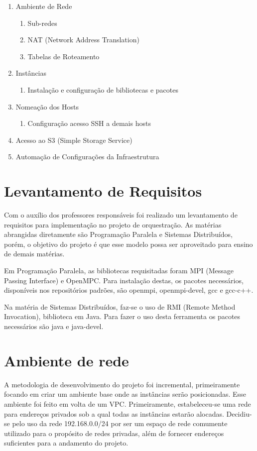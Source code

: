 \documentclass[tg]{mdtufsm}
\begin{document}
\begin{enumerate}
	\item Ambiente de Rede
	\begin{enumerate}
		\item Sub-redes
		\item NAT (Network Address Translation)
		\item Tabelas de Roteamento
	\end{enumerate}
	\item Instâncias
	\begin{enumerate}
		\item Instalação e configuração de bibliotecas e pacotes
	\end{enumerate}
	\item Nomeação dos Hosts
	\begin{enumerate}
		\item Configuração acesso SSH a demais hosts
	\end{enumerate}
	\item Acesso ao S3 (Simple Storage Service)
	\item Automação de Configurações da Infraestrutura
\end{enumerate}


\section{Levantamento de Requisitos}

Com o auxílio dos professores responsáveis foi realizado um levantamento de requisitos para implementação no projeto de orquestração. As matérias abrangidas diretamente são Programação Paralela e Sistemas Distribuídos, porém, o objetivo do projeto é que esse modelo possa ser aproveitado para ensino de demais matérias.

Em Programação Paralela, as bibliotecas requisitadas foram MPI (Message Passing Interface) e OpenMPC. Para instalação destas, os pacotes necessários, disponíveis nos repositórios padrões, são openmpi, openmpi-devel, gcc e gcc-c++.

Na matéria de Sistemas Distribuídos, faz-se o uso de RMI (Remote Method Invocation), biblioteca em Java. Para fazer o uso desta ferramenta os pacotes necessários são java e java-devel.

\section{Ambiente de rede}

A metodologia de desenvolvimento do projeto foi incremental, primeiramente focando em criar um ambiente base onde as instâncias serão posicionadas. Esse ambiente foi feito em volta de um VPC. Primeiramente, estabeleceu-se uma rede para endereços privados sob a qual todas as instâncias estarão alocadas. Decidiu-se pelo uso da rede 192.168.0.0/24 por ser um espaço de rede comumente utilizado para o propósito de redes privadas, além de fornecer endereços suficientes para a andamento do projeto.
\end{document}
